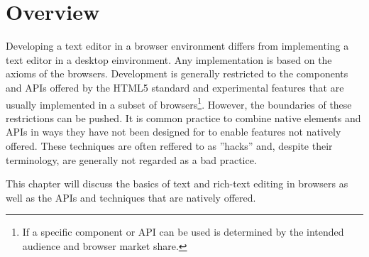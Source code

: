 
\section{Overview}

Developing a text editor in a browser environment differs from implementing a text editor in a desktop einvironment. Any implementation is based on the axioms of the browsers. Development is generally restricted to the components and APIs offered by the HTML5 standard and experimental features that are usually implemented in a subset of browsers\footnote{If a specific component or API can be used is determined by the intended audience and browser market share.}. However, the boundaries of these restrictions can be pushed. It is common practice to combine native elements and APIs in ways they have not been designed for to enable features not natively offered. These techniques are often reffered to as ''hacks'' and, despite their terminology, are generally not regarded as a bad practice.

This chapter will discuss the basics of text and rich-text editing in browsers as well as the APIs and techniques that are natively offered.%




